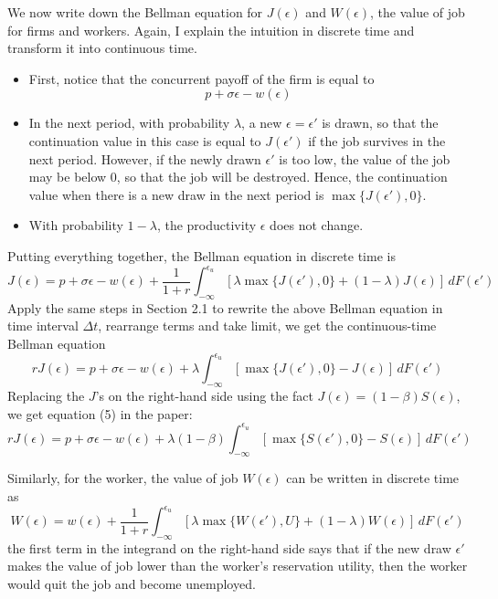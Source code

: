 \documentclass[12pt]{article}
\begin{document}
We now write down the Bellman equation for $J(\epsilon)$ and $W(\epsilon)$, the value of job for firms and workers. Again, I explain the intuition in discrete time and transform it into continuous time. 
\begin{itemize}
	\item First, notice that the concurrent payoff of the firm is equal to
	\[p + \sigma \epsilon - w(\epsilon)\]
	\item In the next period, with probability $\lambda$, a new $\epsilon = \epsilon'$ is drawn, so that the continuation value in this case is equal to $J(\epsilon')$ if the job survives in the next period. However, if the newly drawn $\epsilon'$ is too low, the value of the job may be below 0, so that the job will be destroyed. Hence, the continuation value when there is a new draw in the next period is $\max\{J(\epsilon'), 0\}$.  
	\item With  probability $1- \lambda$, the productivity $\epsilon$ does not change. 
\end{itemize}
Putting everything together, the Bellman equation in discrete time is
\[J(\epsilon) = p + \sigma \epsilon - w(\epsilon) + \frac{1}{1+r} \int_{-\infty}^{\epsilon_u} \left[\lambda \max\{J(\epsilon'), 0\} + (1-\lambda) J(\epsilon) \right]\, dF(\epsilon')\]
Apply the same steps in Section 2.1 to rewrite the above Bellman equation in time interval $\Delta t$, rearrange terms and take limit, we get the continuous-time Bellman equation
\begin{equation}
	r J(\epsilon) = p + \sigma \epsilon - w(\epsilon) + \lambda  \int_{-\infty}^{\epsilon_u} \left[\max\{J(\epsilon') , 0\}- J(\epsilon) \right]\, dF(\epsilon')
\end{equation}
Replacing the $J$'s on the right-hand side using the fact $J(\epsilon) = (1-\beta) S(\epsilon)$, we get equation (5) in the paper:
\begin{equation} \label{eq:J}
	r J(\epsilon) = p + \sigma \epsilon - w(\epsilon) + \lambda (1-\beta) \int_{-\infty}^{\epsilon_u} \left[\max\{S(\epsilon') , 0\}- S(\epsilon) \right]\, dF(\epsilon')
\end{equation}

Similarly, for the worker, the value of job $W(\epsilon)$ can be written in discrete time as
\[W(\epsilon) = w(\epsilon) + \frac{1}{1+r} \int_{-\infty}^{\epsilon_u}\left[\lambda \max\{W(\epsilon'), U\} + (1-\lambda) W(\epsilon)\right]\, dF(\epsilon') \] 
the first term in the integrand on the right-hand side says that if the new draw $\epsilon'$ makes the value of job lower than the worker's reservation utility, then the worker would quit the job and become unemployed.
\end{document}
